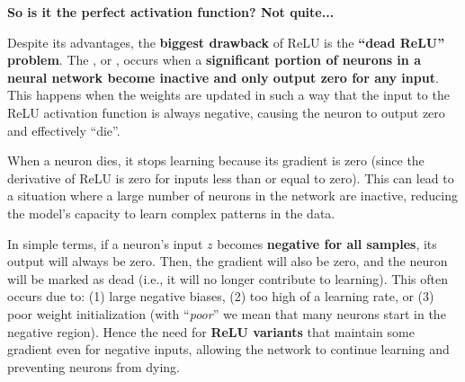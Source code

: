 \highspace
\begin{flushleft}
    \textcolor{Red2}{ \textbf{So is it the perfect activation function? Not quite...}}
\end{flushleft}
Despite its advantages, the \textbf{biggest drawback} of ReLU is the \textbf{``dead ReLU'' problem}. The , or , occurs when a \textbf{significant portion of neurons in a neural network become inactive and only output zero for any input}. This happens when the weights are updated in such a way that the input to the ReLU activation function is always negative, causing the neuron to output zero and effectively ``die''.

\highspace
When a neuron dies, it stops learning because its gradient is zero (since the derivative of ReLU is zero for inputs less than or equal to zero). This can lead to a situation where a large number of neurons in the network are inactive, reducing the model's capacity to learn complex patterns in the data.

\highspace
In simple terms, if a neuron's input $z$ becomes \textbf{negative for all samples}, its output will always be zero. Then, the gradient will also be zero, and the neuron will be marked as dead (i.e., it will no longer contribute to learning). This often occurs due to: (1) large negative biases, (2) too high of a learning rate, or (3) poor weight initialization (with ``\emph{poor}'' we mean that many neurons start in the negative region). Hence the need for \textbf{ReLU variants} that maintain some gradient even for negative inputs, allowing the network to continue learning and preventing neurons from dying.

